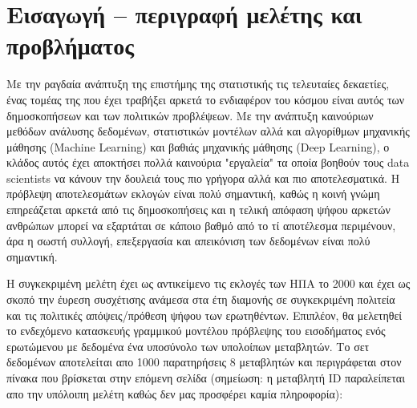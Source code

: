 \documentclass[10pt, letterpaper]{article}
\begin{document}
    \tableofcontents

    \newpage

    \section{Εισαγωγή – περιγραφή μελέτης και προβλήματος}

        \par Με την ραγδαία ανάπτυξη της επιστήμης της στατιστικής τις τελευταίες δεκαετίες, ένας τομέας της που έχει τραβήξει αρκετά το ενδιαφέρον του κόσμου είναι αυτός των δημοσκοπήσεων και των πολιτικών προβλέψεων. Με την ανάπτυξη καινούριων μεθόδων ανάλυσης δεδομένων, στατιστικών μοντέλων αλλά και αλγορίθμων μηχανικής μάθησης (Machine Learning) και βαθιάς μηχανικής μάθησης (Deep Learning), ο κλάδος αυτός έχει αποκτήσει πολλά καινούρια "εργαλεία" τα οποία βοηθούν τους data scientists να κάνουν την δουλειά τους πιο γρήγορα αλλά και πιο αποτελεσματικά. Η πρόβλεψη αποτελεσμάτων εκλογών είναι πολύ σημαντική, καθώς η κοινή γνώμη επηρεάζεται αρκετά από τις δημοσκοπήσεις και η τελική απόφαση ψήφου αρκετών ανθρώπων μπορεί να εξαρτάται σε κάποιο βαθμό από το τί αποτέλεσμα περιμένουν, άρα η σωστή συλλογή, επεξεργασία και απεικόνιση των δεδομένων είναι πολύ σημαντική.
        
        \par Η συγκεκριμένη μελέτη έχει ως αντικείμενο τις εκλογές των ΗΠΑ το 2000 και έχει ως σκοπό την έυρεση συσχέτισης ανάμεσα στα έτη διαμονής σε συγκεκριμένη πολιτεία και τις πολιτικές απόψεις/πρόθεση ψήφου των ερωτηθέντων. Επιπλέον, θα μελετηθεί το ενδεχόμενο κατασκευής γραμμικού μοντέλου πρόβλεψης του εισοδήματος ενός ερωτώμενου με δεδομένα ένα υποσύνολο των υπολοίπων μεταβλητών. Το σετ δεδομένων αποτελείται απο 1000 παρατηρήσεις 8 μεταβλητών και περιγράφεται στον πίνακα που βρίσκεται στην επόμενη σελίδα (σημείωση: η μεταβλητή ID παραλείπεται απο την υπόλοιπη μελέτη καθώς δεν μας προσφέρει καμία πληροφορία):
    
        \newpage
\end{document}
